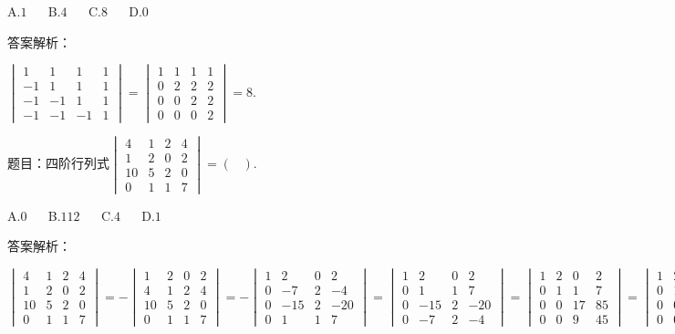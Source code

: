 A.$1$ $\quad$ B.$4$ $\quad$ C.$8$ $\quad$ D.$0$

答案解析：

$\begin{vmatrix}1&1&1&1\\-1&1&1&1\\-1&-1&1&1\\-1&-1&-1&1\end{vmatrix}=\begin{vmatrix}1&1&1&1\\0&2&2&2\\0&0&2&2\\0&0&0&2\end{vmatrix}=8.$



题目：$\mathrm{四阶行列式}\begin{vmatrix}4&1&2&4\\1&2&0&2\\10&5&2&0\\0&1&1&7\end{vmatrix}=(\;\;\;).$

A.$0$ $\quad$ B.$112$ $\quad$ C.$4$ $\quad$ D.$1$

答案解析：

$\begin{vmatrix}4&1&2&4\\1&2&0&2\\10&5&2&0\\0&1&1&7\end{vmatrix}=-\begin{vmatrix}1&2&0&2\\4&1&2&4\\10&5&2&0\\0&1&1&7\end{vmatrix}=-\begin{vmatrix}1&2&0&2\\0&-7&2&-4\\0&-15&2&-20\\0&1&1&7\end{vmatrix}=\begin{vmatrix}1&2&0&2\\0&1&1&7\\0&-15&2&-20\\0&-7&2&-4\end{vmatrix}=\begin{vmatrix}1&2&0&2\\0&1&1&7\\0&0&17&85\\0&0&9&45\end{vmatrix}=\begin{vmatrix}1&2&0&2\\0&1&1&7\\0&0&17&85\\0&0&0&0\end{vmatrix}=0.$



